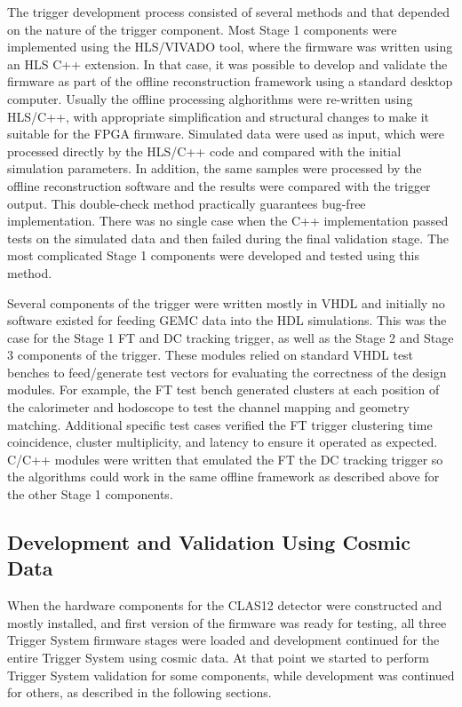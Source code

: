 The trigger development process consisted of several methods and that depended on the nature of the trigger component. Most Stage 1 components were implemented using the HLS/VIVADO tool, where the firmware was written using an HLS C++ extension. In that case, it was possible to develop and validate the firmware as part of the offline reconstruction framework using a standard desktop computer. Usually the offline processing alghorithms were re-written using HLS/C++, with appropriate simplification and structural changes to make it suitable for the FPGA firmware. Simulated data were used as input, which were processed directly by the HLS/C++ code and compared with the initial simulation parameters. In addition, the same samples were processed by the offline reconstruction software and the results were compared with the trigger output. This double-check method practically guarantees bug-free implementation. There was no single case when the C++ implementation passed tests on the simulated data and then failed during the final validation stage. The most complicated Stage 1 components were developed and tested using this method.

Several components of the trigger were written mostly in VHDL and initially no software existed for feeding GEMC data into the HDL simulations. This was the case for the Stage 1 FT and DC tracking trigger, as well as the Stage 2 and Stage 3 components of the trigger. These modules relied on standard VHDL test benches to feed/generate test vectors for evaluating the correctness of the design modules. For example, the FT test bench generated clusters at each position of the calorimeter and hodoscope to test the channel mapping and geometry matching. Additional specific test cases verified the FT trigger clustering time coincidence, cluster multiplicity, and latency to ensure it operated as expected. C/C++ modules were written that emulated the FT the DC tracking trigger so the algorithms could work in the same offline framework as described above for the other Stage 1 components.

\subsection{Development and Validation Using Cosmic Data}

When the hardware components for the CLAS12 detector were constructed and mostly installed, and first version of the firmware was ready for testing, all three Trigger System firmware stages were loaded and development continued for the entire Trigger System using cosmic data. At that point we started to perform Trigger System validation for some components, while development was continued for others, as described in the following sections.

